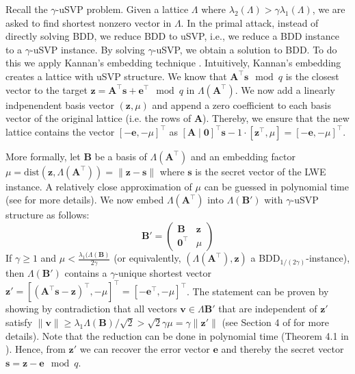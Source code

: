 {Recall the $\gamma$-uSVP problem. Given a lattice $\Lambda$ where $\lambda_2(\Lambda) > \gamma \lambda_1(\Lambda)$, we are asked to find shortest nonzero vector in $\Lambda$. 
In the primal attack, instead of directly solving BDD, we reduce BDD to uSVP, i.e., we reduce a BDD instance to a $\gamma$-uSVP instance. By solving $\gamma$-uSVP, we obtain a solution to BDD. 
To do this we apply Kannan's embedding technique \cite{Kan87}. %
Intuitively, Kannan's embedding creates a lattice with uSVP structure. We know that $\mathbf{A}^\intercal \mathbf{s}\mod q$ is the closest vector to the target $\mathbf{z} =\mathbf{A}^\intercal \mathbf{s} + \mathbf{e}^\intercal \mod q$ in $\Lambda(\mathbf{A}^\intercal)$. We now add a linearly indpenendent basis vector  $(\mathbf{z}, \mu)$ and append a zero coefficient to each basis vector of the original lattice (i.e. the rows of $\mathbf{A}$). Thereby, we ensure that the new lattice contains the vector $[-\mathbf{e}, -\mu]^\intercal$ as $[\mathbf{A} \mid \mathbf{0}]^\intercal \mathbf{s} - 1 \cdot [\mathbf{z}^\intercal, \mu] = [-\mathbf{e}, -\mu]^\intercal$. 

More formally, let $\mathbf{B}$ be a basis of $\Lambda(\mathbf{A}^\intercal)$ %
and an embedding factor $\mu = \text{dist}(\mathbf{z}, \Lambda(\mathbf{A}^\intercal)) = \| \mathbf{z} - \mathbf{s}\|$ where $\mathbf{s}$ is the secret vector of the LWE instance. A relatively close approximation of $\mu$ can be guessed in polynomial time (see \cite{LM09} for more details). We now embed $\Lambda(\mathbf{A}^\intercal)$ into $\Lambda(\mathbf{B}')$ with $\gamma$-uSVP structure as follows: %
\begin{equation}
  \mathbf{B}' = \begin{pmatrix}
    \mathbf{B} & \mathbf{z}\\
    \mathbf{0}^\intercal & \mu
  \end{pmatrix}
\end{equation}
If $\gamma \geq 1$ and $\mu < \frac{\lambda_1(\Lambda(\mathbf{B})}{2\gamma}$ (or equivalently, $(\Lambda(\mathbf{A}^\intercal), \mathbf{z})$ a BDD$_{1/(2\gamma)}$-instance), then $\Lambda(\mathbf{B}')$ contains a $\gamma$-unique shortest vector $\mathbf{z}' = \left[(\mathbf{A}^\intercal\mathbf{s} - \mathbf{z})^\intercal, -\mu\right]^\intercal = \left[-\mathbf{e}^\intercal, -\mu\right]^\intercal$. 
The statement can be proven by showing by contradiction that all vectors $\mathbf{v} \in \Lambda{\mathbf{B}'}$ that are independent of $\mathbf{z}'$ satisfy $\| \mathbf{v}\| \geq \lambda_1{\Lambda(\mathbf{B})}/\sqrt{2} > \sqrt{2}\gamma \mu = \gamma \|\mathbf{z}'\|$ (see Section 4 of \cite{LM09} for more details). Note that the reduction can be done in polynomial time (Theorem 4.1 in \cite{LM09}).%
Hence, from $\mathbf{z}'$ we can recover the error vector $\mathbf{e}$ and thereby the secret vector $\mathbf{s} = \mathbf{z} - \mathbf{e} \mod q$. 

}
